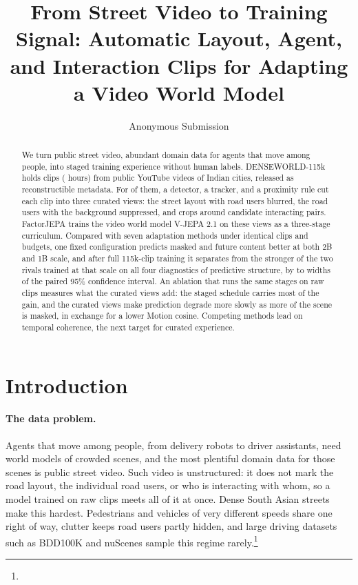 \documentclass[letterpaper]{article} %
\title{From Street Video to Training Signal: Automatic Layout, Agent, and Interaction Clips for Adapting a Video World Model}  %
\author{Anonymous Submission}
\begin{document}
\maketitle

\begin{abstract}
We turn public street video, abundant domain data for agents that move among people, into staged training experience without human labels. DENSEWORLD-115k holds \nClips{} clips (\nHours{} hours) from \nVideos{} public YouTube videos of \nCities{} Indian cities, released as reconstructible metadata. For \nAnnotated{} of them, a detector, a tracker, and a proximity rule cut each clip into three curated views: the street layout with road users blurred, the road users with the background suppressed, and crops around candidate interacting pairs. FactorJEPA trains the video world model V-JEPA 2.1 on these views as a three-stage curriculum. Compared with seven adaptation methods under identical clips and budgets, one fixed configuration predicts masked and future content better at both 2B and 1B scale, and after full 115k-clip training it separates from the stronger of the two rivals trained at that scale on all four diagnostics of predictive structure, by \nSepLo{} to \nSepHi{} widths of the paired 95\% confidence interval. An ablation that runs the same stages on raw clips measures what the curated views add: the staged schedule carries most of the gain, and the curated views make prediction degrade more slowly as more of the scene is masked, in exchange for a lower Motion cosine. Competing methods lead on temporal coherence, the next target for curated experience.
\end{abstract}



\section{Introduction}

\paragraph{The data problem.} Agents that move among people, from delivery robots to driver assistants, need world models of crowded scenes, and the most plentiful domain data for those scenes is public street video. Such video is unstructured: it does not mark the road layout, the individual road users, or who is interacting with whom, so a model trained on raw clips meets all of it at once. Dense South Asian streets make this hardest. Pedestrians and vehicles of very different speeds share one right of way, clutter keeps road users partly hidden, and large driving datasets such as BDD100K \cite{yu2020bdd100k} and nuScenes \cite{caesar2020nuscenes} sample this regime rarely.\footnote{\disclosure}
\end{document}
